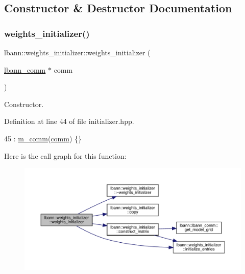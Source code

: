\subsection{Constructor \& Destructor Documentation}
\mbox{\label{classlbann_1_1weights__initializer_a3b65043cb6d76dcfcb07387392429755}} 
\subsubsection{\texorpdfstring{weights\+\_\+initializer()}{weights\_initializer()}}
{\footnotesize\ttfamily lbann\+::weights\+\_\+initializer\+::weights\+\_\+initializer (\begin{DoxyParamCaption}\item[{\hyperlink{classlbann_1_1lbann__comm}{lbann\+\_\+comm} $\ast$}]{comm }\end{DoxyParamCaption})\hspace{0.3cm}{\ttfamily [inline]}}

Constructor. 

Definition at line 44 of file initializer.\+hpp.


\begin{DoxyCode}
45     : \hyperlink{classlbann_1_1weights__initializer_a4273257d92237a75ef9f3614f7e5ddde}{m\_comm}(\hyperlink{file__io_8cpp_ab048c6f9fcbcfaa57ce68b00263dbebe}{comm}) \{\}
\end{DoxyCode}
Here is the call graph for this function\+:\nopagebreak
\begin{figure}[H]
\begin{center}
\leavevmode
\includegraphics[width=350pt]{classlbann_1_1weights__initializer_a3b65043cb6d76dcfcb07387392429755_cgraph}
\end{center}
\end{figure}
\mbox{\label{classlbann_1_1weights__initializer_a9fba102d897402d3df37776d8aa99549}} 
